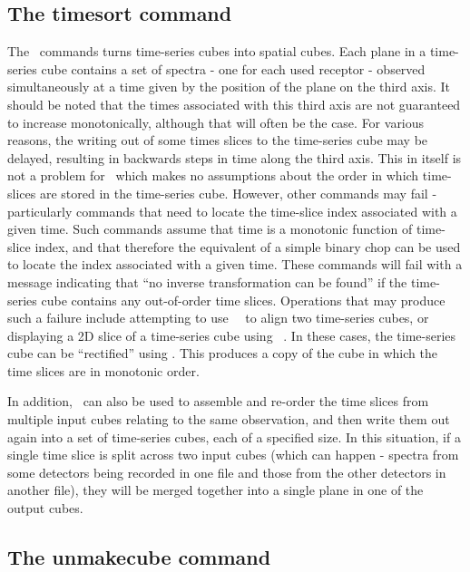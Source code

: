 \documentclass[oneside,11pt]{starlink}
\begin{document}
\subsection{The timesort command}

The \makecube\ commands turns time-series cubes into spatial cubes. Each
plane in a time-series cube contains a set of spectra - one for each
used receptor - observed simultaneously at a time given by the position
of the plane on the third axis. It should be noted that the times
associated with this third axis are not guaranteed to increase
monotonically, although that will often be the case. For various reasons,
the writing out of some times slices to the time-series cube may be delayed,
resulting in backwards steps in time along the third axis. This in itself
is not a problem for \makecube\, which makes no assumptions about the
order in which time-slices are stored in the time-series cube. However,
other commands may fail - particularly commands that need to locate the
time-slice index associated with a given time. Such commands assume that
time is a monotonic function of time-slice index, and that therefore the
equivalent of a simple binary chop can be used to locate the index
associated with a given time. These commands will fail with a message
indicating that ``no inverse transformation can be found'' if the
time-series cube contains any out-of-order time slices. Operations that
may produce such a failure include attempting to use \KAPPA\ \wcsalign\
to align two time-series cubes, or displaying a 2D slice of a time-series
cube using \KAPPA\ \display. In these cases, the time-series cube can be
``rectified'' using \timesort. This produces a copy of the cube in which
the time slices are in monotonic order.

In addition, \timesort\ can also be used to assemble and re-order the time
slices from multiple input cubes relating to the same observation, and then
write them out again into a set of time-series cubes, each of a specified
size. In this situation, if a single time slice is split across two
input cubes (which can happen - spectra from some detectors being recorded
in one file and those from the other detectors in another file), they
will be merged together into a single plane in one of the output cubes.


\subsection{The unmakecube command}
\end{document}
